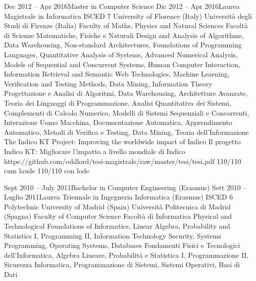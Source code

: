 {    \school
    {Dec 2012 -- Apr 2016}{Master in Computer Science}
    {Dic 2012 -- Apr 2016}{Laurea Magistrale in Informatica}
    {ISCED 7}
      \schoolLocation
        {University of Florence (Italy)}
        {Università degli Studi di Firenze (Italia)}
      \schoolFaculty
        {Faculty of Maths, Physics and Natural Sciences}
        {Facoltà di Scienze Matematiche, Fisiche e Naturali}
      \courses
        {Design and Analysis of Algorithms, Data Warehousing, Non-standard Architectures, Foundations of Programming Languages, Quantitative Analysis of Systems, Advanced Numerical Analysis, Models of Sequential and Concurrent Systems, Human Computer Interaction, Information Retrieval and Semantic Web Technologies, Machine Learning, Verification and Testing Methods, Data Mining, Information Theory}
        {Progettazione e Analisi di Algoritmi, Data Warehousing, Architetture Avanzate, Teoria dei Linguaggi di Programmazione, Analisi Quantitativa dei Sistemi, Complementi di Calcolo Numerico, Modelli di Sistemi Sequenziali e Concorrenti, Interazione Uomo Macchina, Documentazione Automatica, Apprendimento Automatico, Metodi di Verifica e Testing, Data Mining, Teoria dell'Informazione}
      \thesisURL
        {The Indico KT Project: Improving the worldwide impact of Indico}
        {Il progetto Indico KT: Migliorare l'impatto a livello mondiale di Indico}
        {https://github.com/oddlord/tesi-magistrale/raw/master/tesi/tesi.pdf}
      \finalRank
        {110/110 cum laude}
        {110/110 con lode}
    
    \school
    {Sept 2010 -- July 2011}{Bachelor in Computer Engineering (Erasmus)}
    {Sett 2010 -- Luglio 2011}{Laurea Triennale in Ingegneria Informatica (Erasmus)}
    {ISCED 6}
      \schoolLocation
        {Polytechnic University of Madrid (Spain)}
        {Università Politecnica di Madrid (Spagna)}
      \schoolFaculty
        {Faculty of Computer Science}
        {Facoltà di Informatica}
      \courses
        {Physical and Technological Foundations of Informatics, Linear Algebra, Probability and Statistics I, Programming II, Information Technology Security, Systems Programming, Operating Systems, Databases}
        {Fondamenti Fisici e Tecnologici dell'Informatica, Algebra Lineare, Probabilità e Statistica I, Programmazione II, Sicurezza Informatica, Programmazione di Sistemi, Sistemi Operativi, Basi di Dati}
      
}
